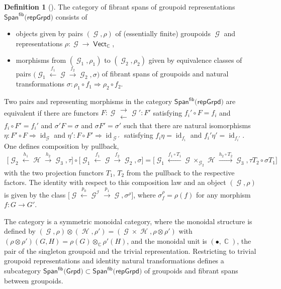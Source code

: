 \documentclass[pdftex]{sigma}
\DeclareMathOperator{\id}{id}
\DeclareMathOperator{\vect}{\mathsf{Vect}}
\DeclareMathOperator{\C}{\mathbb{C}}
\DeclareMathOperator{\calg}{\mathcal{G}}
\DeclareMathOperator{\calh}{\mathcal{H}}
\DeclareMathOperator{\cali}{\mathcal{I}}
\numberwithin{equation}{section}
\theoremstyle{definition}
\newtheorem{Definition}[Definition]{Definition}
\begin{document}
\begin{Definition}[{\cite[Lemmas 2.7 and~2.8]{FMM}}]
 \label{defFibSpan}
 The category of fibrant spans of groupoid representations $\mathsf{Span}^{\mathsf{fib}}(\mathsf{repGrpd)}$ consists of
 \begin{itemize}\itemsep=0pt
 \item objects given by pairs $(\calg, \rho)$ of (essentially finite) groupoids $\calg$ and representations $\rho\colon \calg \rightarrow \vect_{\C}$,
 \item morphisms from $(\calg_1, \rho_1)$ to $(\calg_2, \rho_2)$ given by equivalence classes of pairs $\bigl(\calg_1 \xleftarrow{f_1} \calg \xrightarrow{f_2} \calg_2, \sigma\bigr)$ of fibrant spans of groupoids and natural transformations $\sigma\colon \rho_1 \circ f_1 \Rightarrow \rho_2 \circ f_2$.
 \end{itemize}
 Two pairs \smash{$\bigl(\calg_1 \xleftarrow{f_1} \calg \xrightarrow{f_2} \calg_2, \sigma\bigr)$} and \smash{$\bigl(\calg_1 \xleftarrow{f_1'} \calg' \xrightarrow{f_2'} \calg_2, \sigma'\bigr)$} representing morphisms in the category $\mathsf{Span}^{\mathsf{fib}}(\mathsf{repGrpd)}$ are equivalent if there are functors $F\colon \calg \substack{\longrightarrow \\ \longleftarrow} \calg' : \!F' $ satisfying $f_i' \circ F = f_i$ and $f_i \circ F' = f_i'$ and $\sigma' F = \sigma$ and $\sigma F' = \sigma'$ such that there are natural isomorphisms $\eta\colon F' \circ F \Rightarrow \id_{\calg}$ and $\eta'\colon F \circ F' \Rightarrow \id_{\calg'}$ satisfying $f_i \eta = \id_{f_i}$ and $f_i' \eta' = \id_{f_i'}$. One defines composition by pullback,
 \begin{align*}
 \bigl[\calg_2 \xleftarrow{h_1} \calh \xrightarrow{h_2} \calg_3, \tau\bigr] \circ \bigl[\calg_1 \xleftarrow{f_1} \calg \xrightarrow{f_2} \calg_2, \sigma\bigr] = \bigl[\calg_1 \xleftarrow{f_1 \circ T_1} \calg \times_{\calg_2} \calh \xrightarrow{h_2 \circ T_2} \calg_3, \tau T_2 \circ \sigma T_1\bigr]
 \end{align*}
 with the two projection functors $T_1$, $T_2$ from the pullback to the respective factors. The identity with respect to this composition law and an object $(\calg, \rho)$ is given by the class $\bigl[\calg \xleftarrow{p_0} \calg^{\cali} \xrightarrow{p_1} \calg, \sigma^{\rho}\bigr]$, where $\sigma^{\rho}_{f} = \rho(f)$ for any morphism $f\colon G \rightarrow G'$.
\end{Definition}
The category  is a symmetric monoidal category, where the monoidal structure is defined by $(\calg, \rho) \otimes (\calh, \rho') = (\calg \times \calh, \rho \otimes \rho')$ with $(\rho \otimes \rho')(G, H) = \rho(G) \otimes_{\C} \rho'(H)$, and the monoidal unit is $(\bullet, \C)$, the pair of the singleton groupoid and the trivial representation. Restricting to trivial groupoid representations and identity natural transformations defines a subcategory $\mathsf{Span}^{\mathsf{fib}}(\mathsf{Grpd)} \subset \mathsf{Span}^{\mathsf{fib}}(\mathsf{repGrpd)}$ of groupoids and fibrant spans between groupoids.
\end{document}
